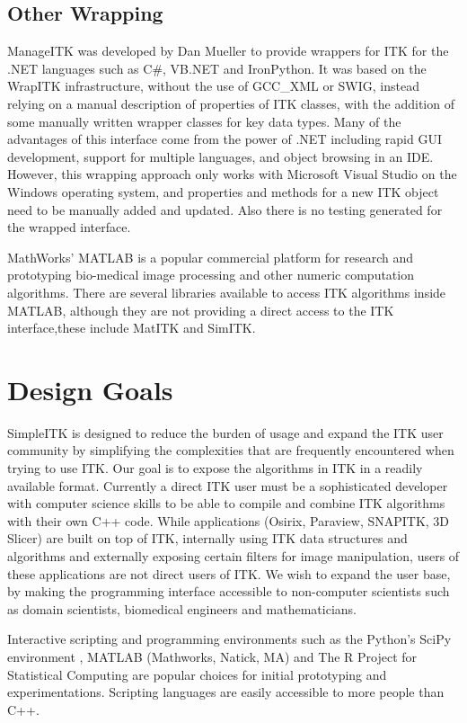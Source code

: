 \documentclass{frontiersMED} %
\begin{document}
\subsection{Other Wrapping}
ManageITK was developed by Dan Mueller \cite{Mueller2007} to provide
wrappers for ITK for the .NET languages such as C\#, VB.NET and
IronPython. It was based on the WrapITK infrastructure, without the
use of GCC\_XML or SWIG, instead relying on a manual description of
properties of ITK classes, with the addition of some manually written
wrapper classes for key data types. Many of the advantages of this
interface come from the power of .NET including rapid GUI development,
support for multiple languages, and object browsing in an
IDE. However, this wrapping approach only works with Microsoft Visual
Studio on the Windows operating system, and properties and methods for
a new ITK object need to be manually added and updated.  Also there is
no testing generated for the wrapped interface.

MathWorks’ MATLAB is a popular commercial platform for research and
prototyping bio-medical image processing and other numeric computation
algorithms. There are several libraries available to access ITK
algorithms inside MATLAB, although they are not providing a direct
access to the ITK interface,these include MatITK\cite{Chu2006} and
SimITK\cite{Dickinson2011}.

\section{Design Goals}

SimpleITK is designed to reduce the burden of usage and expand the ITK
user community by simplifying the complexities that are frequently
encountered when trying to use ITK. Our goal is to expose the
algorithms in ITK in a readily available format. Currently a direct
ITK user must be a sophisticated developer with computer science
skills to be able to compile and combine ITK algorithms with their own
C++ code. While applications (Osirix, Paraview, SNAPITK, 3D Slicer)
are built on top of ITK, internally using ITK data structures and
algorithms and externally exposing certain filters for image
manipulation, users of these applications are not direct users of
ITK. We wish to expand the user base, by making the programming
interface accessible to non-computer scientists such as domain
scientists, biomedical engineers and mathematicians.

Interactive scripting and programming environments such as the
Python’s SciPy environment \cite{Jones2001}, MATLAB (Mathworks, Natick, MA)
and The R Project for Statistical Computing are popular choices for
initial prototyping and experimentations. Scripting languages are
easily accessible to more people than C++.
\end{document}
